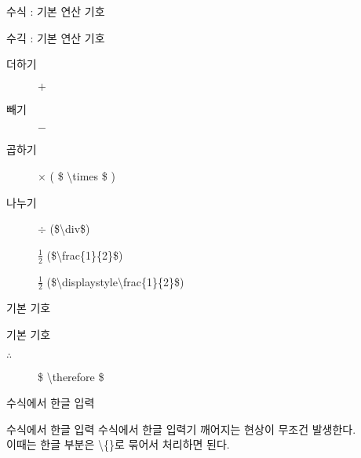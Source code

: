 \documentclass[ aspectratio=149,  10pt,blue,xcolor=pdftex,dvipsnames,table,handout,notes]{beamer}
\begin{document}
		\begin{frame}[t]{수식 : 기본 연산 기호}

			\begin{block} {수긱 : 기본 연산 기호}
			\begin{description}
			\item[더하기] 	$+$
			\item[빼기] 	$-$
			\item[곱하기] 	$\times$ ( \$ \textbackslash times \$ )
			\item[나누기] 	$\div$ (\$\textbackslash div\$)
			\item[] 		$\frac{1}{2}$ (\$\textbackslash frac\{1\}\{2\}\$)
			\item[] 		$\displaystyle\frac{1}{2}$
						(\$\textbackslash displaystyle\textbackslash frac\{1\}\{2\}\$)
			\end{description}
			\end{block}

		\note[item]{}
		\end{frame}


		\begin{frame}[t]{기본 기호}

			\begin{block} {기본 기호}
			\begin{description}
			\item[$\therefore$] 	\$ \textbackslash therefore \$
			\end{description}
			\end{block}

		\note[item]{}
		\end{frame}


		\begin{frame}[t]{수식에서 한글 입력}

			\begin{block} {수식에서 한글 입력}
			수식에서 한글 입력기 깨어지는 현상이 무조건 발생한다.\\
			이때는 한글 부분은 \textbackslash \{\}로 묶어서 처리하면 된다.
			\end{block}

		\note[item]{}
		\end{frame}
\end{document}
